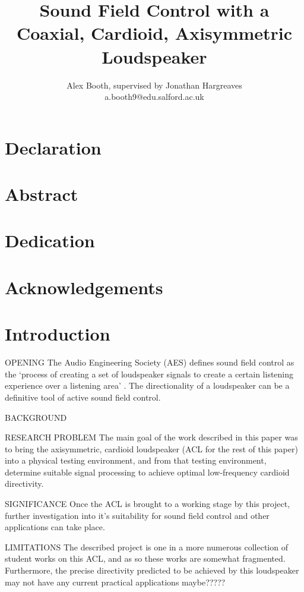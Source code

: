 \documentclass{report}
\title{Sound Field Control with a Coaxial, Cardioid, Axisymmetric Loudspeaker}
\author{Alex Booth, supervised by Jonathan Hargreaves\\ a.booth9@edu.salford.ac.uk}
\begin{document}
\maketitle

\chapter*{Declaration}

\chapter*{Abstract}
    \textit{}

\chapter*{Dedication}



\chapter*{Acknowledgements}

\tableofcontents
\newpage

\chapter{Introduction}
    OPENING
    The Audio Engineering Society (AES) defines sound field control as the `process of creating a set of loudspeaker signals to create a certain listening experience over a listening area' \cite{AESsoundfieldcontrol}.
    The directionality of a loudspeaker can be a definitive tool of active sound field control.

    BACKGROUND

    RESEARCH PROBLEM
    The main goal of the work described in this paper was to bring the axisymmetric, cardioid loudspeaker (ACL for the rest of this paper) into a physical testing environment, and from that testing environment, determine suitable signal processing to achieve optimal low-frequency cardioid directivity.

    SIGNIFICANCE
    Once the ACL is brought to a working stage by this project, further investigation into it's suitability for sound field control and other applications can take place.

    LIMITATIONS
    The described project is one in a more numerous collection of student works on this ACL, and as so these works are somewhat fragmented.
    Furthermore, the precise directivity predicted to be achieved by this loudspeaker may not have any current practical applications maybe?????
\end{document}
